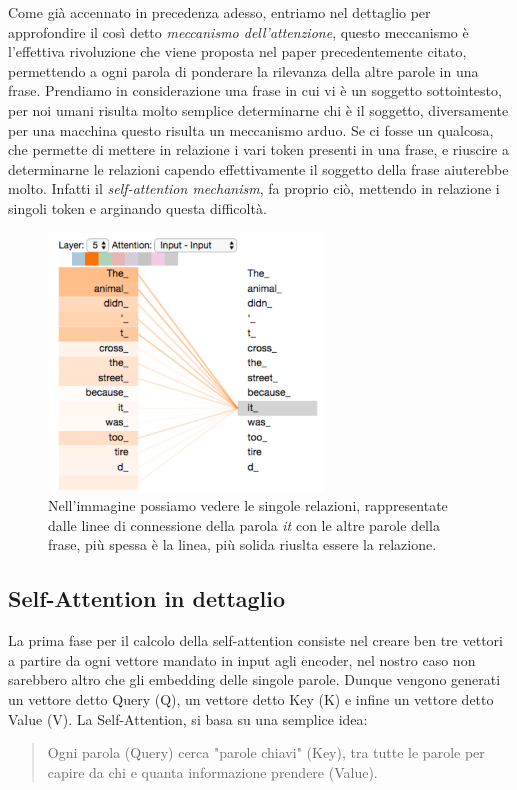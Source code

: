 Come già accennato in precedenza adesso, entriamo nel dettaglio per approfondire il così detto \textit{meccanismo dell'attenzione}, questo meccanismo è l'effettiva rivoluzione che viene proposta nel paper precedentemente citato, permettendo a ogni parola di ponderare la rilevanza della altre parole in una frase. Prendiamo in considerazione una frase in cui vi è un soggetto sottointesto, per noi umani risulta molto semplice determinarne chi è il soggetto, diversamente per una macchina questo risulta un meccanismo arduo. Se ci fosse un qualcosa, che permette di mettere in relazione i vari token presenti in una frase, e riuscire a determinarne le relazioni capendo effettivamente il soggetto della frase aiuterebbe molto. Infatti il \textit{self-attention mechanism}, fa proprio ciò, mettendo in relazione i singoli token e arginando questa difficoltà.

\begin{figure}
    \centering
    \includegraphics[width=0.65\textwidth]{figure/selfAttention}
    \caption{Nell'immagine possiamo vedere le singole relazioni, rappresentate dalle linee di connessione della parola \textit{it} con le altre parole della frase, più spessa è la linea, più solida riuslta essere la relazione.}
    \label{fig:selfAtt}
\end{figure}


\subsection{Self-Attention in dettaglio}

La prima fase per il calcolo della self-attention consiste nel creare ben tre vettori a partire da ogni vettore mandato in input agli encoder, nel nostro caso non sarebbero altro che gli embedding delle singole parole. Dunque vengono generati un vettore detto Query (Q), un vettore detto Key (K) e infine un vettore detto Value (V). La Self-Attention, si basa su una semplice idea: 
\begin{quote}
    Ogni parola (Query) cerca "parole chiavi" (Key), tra tutte le parole per capire da chi e quanta informazione prendere (Value).
\end{quote}

